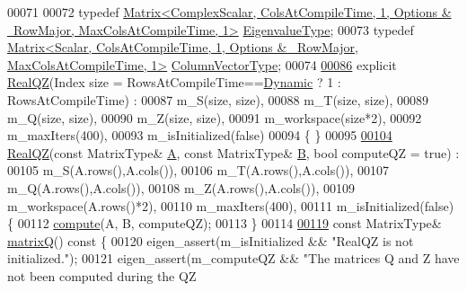 \begin{DoxyCode}
00071 
00072       \textcolor{keyword}{typedef} 
      \hyperlink{group___core___module}{Matrix<ComplexScalar, ColsAtCompileTime, 1, Options & ~RowMajor, MaxColsAtCompileTime, 1>}
       \hyperlink{group___core___module}{EigenvalueType};
00073       \textcolor{keyword}{typedef} 
      \hyperlink{group___core___module}{Matrix<Scalar, ColsAtCompileTime, 1, Options & ~RowMajor, MaxColsAtCompileTime, 1>}
       \hyperlink{group___core___module}{ColumnVectorType};
00074 
\hyperlink{group___eigenvalues___module_ad8fb9235870a8361a2fdd8dcc2e80d01}{00086}       \textcolor{keyword}{explicit} \hyperlink{group___eigenvalues___module_ad8fb9235870a8361a2fdd8dcc2e80d01}{RealQZ}(Index size = RowsAtCompileTime==\hyperlink{namespace_eigen_ad81fa7195215a0ce30017dfac309f0b2}{Dynamic} ? 1 : RowsAtCompileTime) :
00087         m\_S(size, size),
00088         m\_T(size, size),
00089         m\_Q(size, size),
00090         m\_Z(size, size),
00091         m\_workspace(size*2),
00092         m\_maxIters(400),
00093         m\_isInitialized(false)
00094         \{ \}
00095 
\hyperlink{group___eigenvalues___module_ac6e41c839f8dae31c9a3906ea7540119}{00104}       \hyperlink{group___eigenvalues___module_ac6e41c839f8dae31c9a3906ea7540119}{RealQZ}(\textcolor{keyword}{const} MatrixType& \hyperlink{group___core___module_class_eigen_1_1_matrix}{A}, \textcolor{keyword}{const} MatrixType& \hyperlink{group___core___module_class_eigen_1_1_matrix}{B}, \textcolor{keywordtype}{bool} computeQZ = \textcolor{keyword}{true}) :
00105         m\_S(A.rows(),A.cols()),
00106         m\_T(A.rows(),A.cols()),
00107         m\_Q(A.rows(),A.cols()),
00108         m\_Z(A.rows(),A.cols()),
00109         m\_workspace(A.rows()*2),
00110         m\_maxIters(400),
00111         m\_isInitialized(false) \{
00112           \hyperlink{group___eigenvalues___module_a2b6847964d9f1903193cc3e67c196849}{compute}(A, B, computeQZ);
00113         \}
00114 
\hyperlink{group___eigenvalues___module_a212bc2f69ea4eff830fde70e209e40fb}{00119}       \textcolor{keyword}{const} MatrixType& \hyperlink{group___eigenvalues___module_a212bc2f69ea4eff830fde70e209e40fb}{matrixQ}()\textcolor{keyword}{ const }\{
00120         eigen\_assert(m\_isInitialized && \textcolor{stringliteral}{"RealQZ is not initialized."});
00121         eigen\_assert(m\_computeQZ && \textcolor{stringliteral}{"The matrices Q and Z have not been computed during the QZ
}
\end{DoxyCode}
